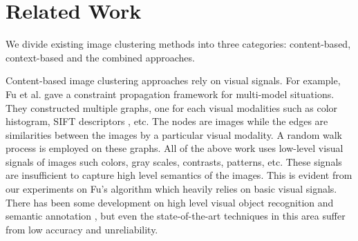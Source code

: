 \section{Related Work}
\label{sec:related}

\newcommand{\QS}[1]{\textcolor{magenta}{[Qingyu: #1]}}


We divide existing image clustering methods into three categories:
content-based, context-based and the combined approaches.

Content-based image clustering approaches \cite{FergusFPZ05,FanGL07,GaoFLS08}
rely on visual signals.
For example, Fu et al.\cite{Fu2011} gave a constraint propagation
framework for multi-model situations. They constructed multiple graphs,
one for each visual modalities
such as color histogram, SIFT descriptors \cite{Lowe99}, etc. The nodes are images
while the edges are similarities between the images by a particular visual modality.
A random walk process is employed on these graphs.
All of the above work uses low-level visual signals of images such colors,
gray scales, contrasts, patterns, etc. These signals are insufficient
to capture high level semantics of the images. This is evident from our
experiments on Fu's algorithm which heavily relies on basic visual signals.
There has been some development on high level visual object recognition
and semantic annotation \cite{Li09scene}, but even the state-of-the-art
techniques in this area suffer from low accuracy and unreliability.

